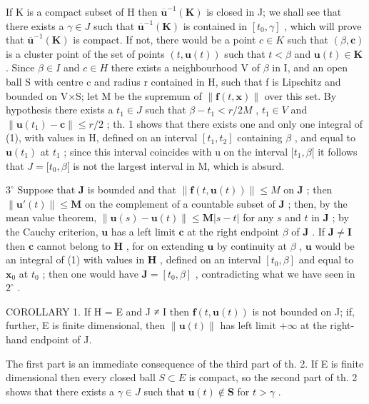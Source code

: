 If K is a compact subset of H then \(\overline{\mathbf{u}}^{-1}(\mathbf{K})\) is closed in J; we shall see that there exists a \(\gamma\in J\) such that \(\overline{\mathbf{u}}^{-1}(\mathbf{K})\) is contained in \([t_{0},\gamma]\) , which will prove that \(\overline{\mathbf{u}}^{-1}(\mathbf{K})\) is compact. If not, there would be a point \(c\in K\) such that \((\beta,\mathbf{c})\) is a cluster point of the set of points \((t,\mathbf{u}(t))\) such that \(t<\beta\) and \(\mathbf{u}(t)\in\mathbf{K}\) . Since \(\beta\in I\) and \(c\in H\) there exists a neighbourhood V of \(\beta\) in I, and an open ball S with centre c and radius r contained in H, such that f is Lipschitz and bounded on V×S; let M be the supremum of \(\|\mathbf{f}(t,\mathbf{x})\|\) over this set. By hypothesis there exists a \(t_{1}\in J\) such that \(\beta-t_{1}<r/2M\) , \(t_{1}\in V\) and \(\|\mathbf{u}(t_{1})-\mathbf{c}\|\leqslant r/2\) ; th. 1 shows that there exists one and only one integral of (1), with values in H, defined on an interval \([t_{1},t_{2}]\) containing \(\beta\) , and equal to \(\mathbf{u}(t_{1})\) at \(t_{1}\) ; since this interval coincides with u on the interval \([t_{1},\beta[\) it follows that \(J=[t_{0},\beta[\) is not the largest interval in M, which is absurd.

\(3^{\circ}\) Suppose that \(\mathbf{J}\) is bounded and that \(\| \mathbf{f}(t,\mathbf{u}(t))\| \leqslant M\) on \(\mathbf{J}\) ; then \(\| \mathbf{u}'(t)\| \leqslant \mathbf{M}\) on the complement of a countable subset of \(\mathbf{J}\) ; then, by the mean value theorem, \(\| \mathbf{u}(s) - \mathbf{u}(t)\| \leqslant \mathbf{M} |s - t|\) for any \(s\) and \(t\) in \(\mathbf{J}\) ; by the Cauchy criterion, \(\mathbf{u}\) has a left limit \(\mathbf{c}\) at the right endpoint \(\beta\) of \(\mathbf{J}\) . If \(\mathbf{J} \neq \mathbf{I}\) then \(\mathbf{c}\) cannot belong to \(\mathbf{H}\) , for on extending \(\mathbf{u}\) by continuity at \(\beta\) , \(\mathbf{u}\) would be an integral of (1) with values in \(\mathbf{H}\) , defined on an interval \([t_0, \beta]\) and equal to \(\mathbf{x}_0\) at \(t_0\) ; then one would have \(\mathbf{J} = [t_0, \beta]\) , contradicting what we have seen in \(2^{\circ}\) .

COROLLARY 1. If H = E and J ≠ I then \(\mathbf{f}(t, \mathbf{u}(t))\) is not bounded on J; if, further, E is finite dimensional, then \(\| \mathbf{u}(t) \|\) has left limit \(+\infty\) at the right-hand endpoint of J.

The first part is an immediate consequence of the third part of th. 2. If E is finite dimensional then every closed ball \(S \subset E\) is compact, so the second part of th. 2 shows that there exists a \(\gamma \in J\) such that \(\mathbf{u}(t) \notin \mathbf{S}\) for \(t > \gamma\) .

